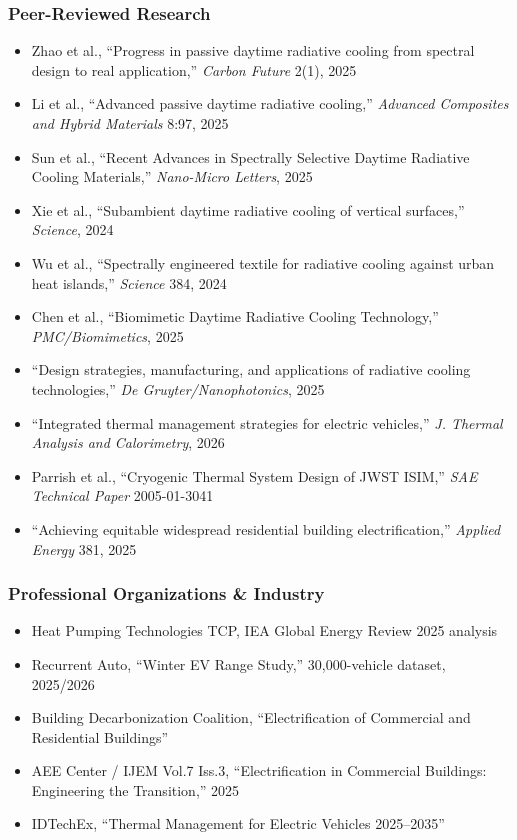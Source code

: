 \documentclass[11pt,letterpaper]{article}
\begin{document}
\subsubsection{Peer-Reviewed Research}
\begin{itemize}[leftmargin=2em]
\item Zhao et al., ``Progress in passive daytime radiative cooling from spectral design to real application,'' \textit{Carbon Future} 2(1), 2025
\item Li et al., ``Advanced passive daytime radiative cooling,'' \textit{Advanced Composites and Hybrid Materials} 8:97, 2025
\item Sun et al., ``Recent Advances in Spectrally Selective Daytime Radiative Cooling Materials,'' \textit{Nano-Micro Letters}, 2025
\item Xie et al., ``Subambient daytime radiative cooling of vertical surfaces,'' \textit{Science}, 2024
\item Wu et al., ``Spectrally engineered textile for radiative cooling against urban heat islands,'' \textit{Science} 384, 2024
\item Chen et al., ``Biomimetic Daytime Radiative Cooling Technology,'' \textit{PMC/Biomimetics}, 2025
\item ``Design strategies, manufacturing, and applications of radiative cooling technologies,'' \textit{De Gruyter/Nanophotonics}, 2025
\item ``Integrated thermal management strategies for electric vehicles,'' \textit{J. Thermal Analysis and Calorimetry}, 2026
\item Parrish et al., ``Cryogenic Thermal System Design of JWST ISIM,'' \textit{SAE Technical Paper} 2005-01-3041
\item ``Achieving equitable widespread residential building electrification,'' \textit{Applied Energy} 381, 2025
\end{itemize}

\subsubsection{Professional Organizations \& Industry}
\begin{itemize}[leftmargin=2em]
\item Heat Pumping Technologies TCP, IEA Global Energy Review 2025 analysis
\item Recurrent Auto, ``Winter EV Range Study,'' 30,000-vehicle dataset, 2025/2026
\item Building Decarbonization Coalition, ``Electrification of Commercial and Residential Buildings''
\item AEE Center / IJEM Vol.7 Iss.3, ``Electrification in Commercial Buildings: Engineering the Transition,'' 2025
\item IDTechEx, ``Thermal Management for Electric Vehicles 2025--2035''
\end{itemize}
\end{document}
